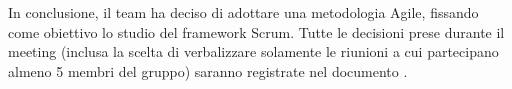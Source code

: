 \vspace{0.5\baselineskip}
In conclusione, il team ha deciso di adottare una metodologia Agile, fissando come obiettivo lo studio del framework Scrum. Tutte le decisioni prese durante il meeting (inclusa la scelta di verbalizzare solamente le riunioni a cui partecipano almeno 5 membri del gruppo) saranno registrate nel documento \NdP.
\clearpage

